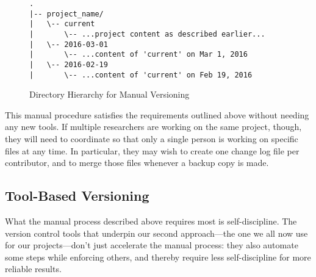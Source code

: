 \documentclass[10pt]{article}
\begin{document}
\begin{figure}
\begin{verbatim}
.
|-- project_name/
|   \-- current
|       \-- ...project content as described earlier...
|   \-- 2016-03-01
|       \-- ...content of 'current' on Mar 1, 2016
|   \-- 2016-02-19
|       \-- ...content of 'current' on Feb 19, 2016
\end{verbatim}
\caption{Directory Hierarchy for Manual Versioning}
\label{fig:manual}
\end{figure}

This manual procedure satisfies the requirements outlined above without
needing any new tools. If multiple researchers are working on the same
project, though, they will need to coordinate so that only a single
person is working on specific files at any time. In particular, they may
wish to create one change log file per contributor, and to merge those
files whenever a backup copy is made.

\subsection*{Tool-Based Versioning}

What the manual process described above requires most is
self-discipline. The version control tools that underpin our second
approach---the one we all now use for our projects---don't just
accelerate the manual process: they also automate some steps while
enforcing others, and thereby require less self-discipline for more
reliable results.
\end{document}
